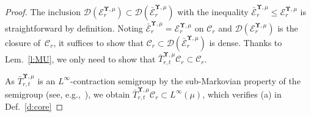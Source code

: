 \documentclass[11pt,letterpaper]{amsart}
\newcommand{\dom}[1]{\mathcal D(#1)}
\newcommand{\QP}{{\mu}}
\newcommand{\dUpsilon}{{\mathbf \Upsilon}}
\newcommand{\U}{\dUpsilon}
\newcommand{\E}{\mathcal E}
\renewcommand{\1}{\mathbf 1}
\numberwithin{equation}{section}
\theoremstyle{plain}
\theoremstyle{definition}
\theoremstyle{remark}
\begin{document}
\begin{proof}
The inclusion $\dom{\E^{\U, \QP}_r}\subset\dom{\bar{\E}^{\U, \QP}_r}$ with the inequality $\bar{\E}^{\U, \QP}_r \le \E^{\U, \QP}_r$ is straightforward by definition. 
Noting $\bar{\E}^{\U, \QP}_r = \E^{\U, \QP}_r$ on $\mathcal C_r$ and $\dom{\E^{\U, \QP}_r}$ is the closure of~$\mathcal C_r$, it suffices to show that $\mathcal C_r\subset \dom{\bar{\E}^{\U, \QP}_r}$ is dense. 
Thanks to Lem.~\ref{l:MU}, we only need to show that $\bar{T}_{r, t}^{\U, \QP}\mathcal C_r \subset \mathcal C_r$. 

As $\bar{T}_{r, t}^{\U, \QP}$ is an $L^\infty$-contraction semigroup by the sub-Markovian property of the semigroup (see, e.g.,~\cite[Def.~I.4.1]{MaRoe90}), we obtain $\bar{T}_{r, t}^{\U, \QP} \mathcal C_r \subset L^\infty(\mu)$, which verifies (a) in Def.~\ref{d:core}


\end{proof}
\end{document}
